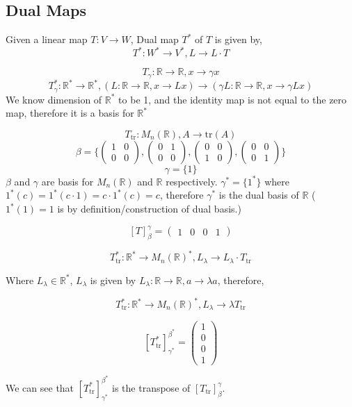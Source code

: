\documentclass[11pt,a4paper]{colorart}
\def\l{\left}
\def\r{\right}
\def\R{\mathbb{R}}
\def\b{\beta}
\def\g{\gamma}
\begin{document}
\subsection{Dual Maps}

\begin{definition}
	Given a linear map $T:V\rightarrow W$, Dual map $T^*$ of $T$ is given by,
	\[T^*:W^*\rightarrow V^*, L \rightarrow L\cdot T \]
\end{definition}

\begin{example}
	\[ T_\g : \R \rightarrow \R, x \rightarrow \g x \]
	\[ T_\g^* : \R^* \rightarrow \R^*, \l(L:\R \rightarrow \R,x \rightarrow Lx\r) \rightarrow \l(\g L : \R \rightarrow \R, x \rightarrow \g Lx \r) \]
	We know dimension of $\R^*$ to be 1, and the identity map is not equal to the zero map, therefore it is a basis for $\R^*$
\end{example}

\begin{example}
	\[ T_\text{tr}: M_n\l(\R\r), A \rightarrow \text{tr}\l(A\r) \]
	\[ \b = \bigg\{ \begin{pmatrix} 1 & 0 \\ 0 & 0 \end{pmatrix},
			\begin{pmatrix} 0 & 1 \\ 0 & 0 \end{pmatrix},  
			\begin{pmatrix} 0 & 0 \\ 1 & 0 \end{pmatrix},
			\begin{pmatrix} 0 & 0 \\ 0 & 1 \end{pmatrix} \bigg\} \]
	\[ \g = \{ 1 \} \]
	$\b$ and $\g$ are basis for $M_n\l(\R\r)$ and $\R$ respectively.
	$\g^*=\{1^*\}$ where $1^*\l(c\r) = 1^*\l(c\cdot 1\r)=c\cdot 1^*\l(c\r) = c$, therefore $\g^*$ is the dual basis of $\R$ ($1^*\l(1\r) = 1$ is by definition/construction of dual basis.)  
	
	\[ \l[T\r]^\g_\b = \begin{pmatrix} 1 & 0 & 0 & 1 \end{pmatrix} \]
	
	\[ T_\text{tr}^*: \R^* \rightarrow M_n\l(\R\r)^*, L_\lambda \rightarrow L_\lambda\cdot T_\text{tr}\]
	
	Where $L_\lambda\in \R^*$, $L_\lambda$ is given by $L_\lambda:\R\rightarrow\R,a\rightarrow\lambda a$, therefore,
	
	\[ T_\text{tr}^*: \R^* \rightarrow M_n\l(\R\r)^*, L_\lambda \rightarrow\lambda T_\text{tr}\]
	
	\[ \l[T_\text{tr}^*\r]_{\g^*}^{\b^*} = \begin{pmatrix}1\\0\\0\\1\end{pmatrix} \]

	We can see that $ \l[T_\text{tr}^*\r]_{\g^*}^{\b^*}$ is the transpose of $ \l[T_\text{tr}\r]^\g_\b$.

\end{example}
	
\end{document}
